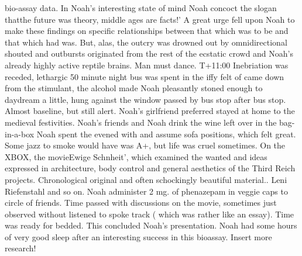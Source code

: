 \documentclass[12pt]{book}
\begin{document}
bio-assay data. In Noah's interesting state of mind Noah concoct the slogan thatthe future was theory, middle ages are facts!' A great urge fell upon Noah to make these findings on specific relationships between that which was to be and that which had was. But, alas, the outcry was drowned out by omnidirectional shouted and outbursts originated from the rest of the ecstatic crowd and Noah's already highly active reptile brains. Man must dance. T+11:00 Inebriation was receded, lethargic 50 minute night bus was spent in the iffy felt of came down from the stimulant, the alcohol made Noah pleasantly stoned enough to daydream a little, hung against the window passed by bus stop after bus stop. Almost baseline, but still alert. Noah's girlfriend preferred stayed at home to the medieval festivities. Noah's friends and Noah drink the wine left over in the bag-in-a-box Noah spent the evened with and assume sofa positions, which felt great. Some jazz to smoke would have was A+, but life was cruel sometimes. On the XBOX, the movieEwige Schnheit', which examined the wanted and ideas expressed in architecture, body control and general aesthetics of the Third Reich projects. Chronological original and often schockingly beautiful material.. Leni Riefenstahl and so on. Noah administer 2 mg. of phenazepam in veggie caps to circle of friends. Time passed with discussions on the movie, sometimes just observed without listened to spoke track ( which was rather like an essay). Time was ready for bedded. This concluded Noah's presentation. Noah had some hours of very good sleep after an interesting success in this bioassay. Insert more research!
\end{document}
